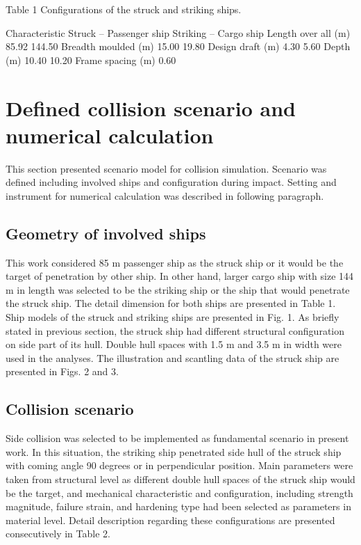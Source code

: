 \documentclass[10pt,journal]{IEEEtran}
\begin{document}
Table 1 
Configurations of the struck and striking ships. 

Characteristic Struck – Passenger ship  Striking – Cargo ship 
Length over all (m) 85.92 144.50 
Breadth moulded (m) 15.00 19.80 
Design draft (m) 4.30 5.60 
Depth (m) 10.40 10.20 
Frame spacing (m) 0.60 ­


\section{Defined collision scenario and numerical calculation}

This section presented scenario model for collision simulation. 
Scenario was defined including involved ships and configuration during impact. Setting and instrument for numerical calculation was described in following paragraph. 

\subsection{Geometry of involved ships}

This work considered 85 m passenger ship as the struck ship or it would be the target of penetration by other ship. 
In other hand, larger cargo ship with size 144 m in length was selected to be the striking ship or the ship that would penetrate the struck ship. 
The detail dimension for both ships are presented in Table 1. Ship models of the struck and striking ships are presented in Fig. 1. 
As briefly stated in previous section, the struck ship had different structural configuration on side part of its hull. Double hull spaces with 1.5 m and 3.5 m in width were used in the analyses. 
The illustration and scantling data of the struck ship are presented in Figs. 2 and 3. 

\subsection{Collision scenario}

Side collision was selected to be implemented as fundamental scenario in present work. 
In this situation, the striking ship penetrated side hull of the struck ship with coming angle 90 degrees or in perpendicular position. 
Main parameters were taken from structural level as different double hull spaces of the struck ship would be the target, and mechanical character­istic and configuration, including strength magnitude, 
failure strain, and hardening type had been selected as parameters in material level. Detail description regarding these configurations are presented consecutively in Table 2. 
\end{document}

